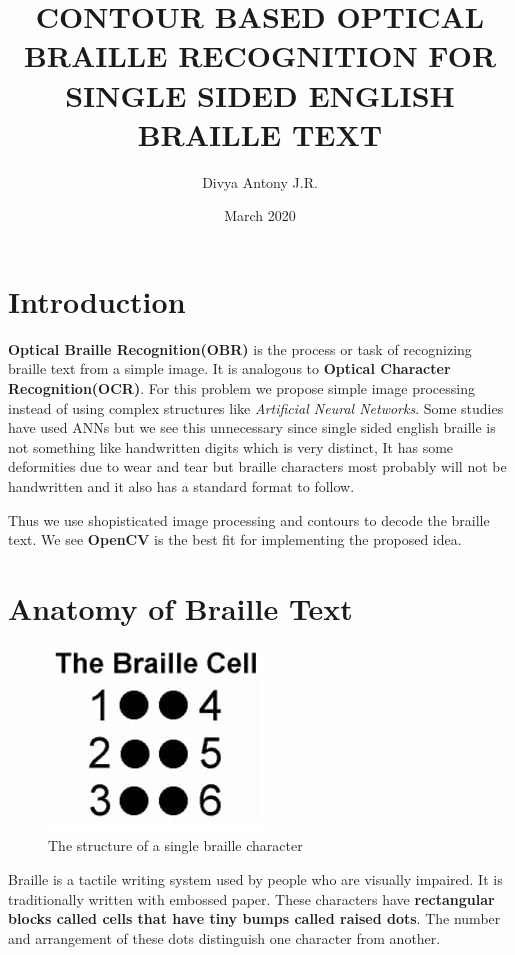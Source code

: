 \documentclass{article}
\title{CONTOUR BASED OPTICAL BRAILLE RECOGNITION FOR SINGLE SIDED ENGLISH BRAILLE TEXT}
\author{Divya Antony J.R.}
\date{March 2020}
\begin{document}
\maketitle

\section{Introduction}

\textbf{Optical Braille Recognition(OBR)} is the process or task of recognizing braille text from a simple image.
It is analogous to \textbf{Optical Character Recognition(OCR)}. For this problem we propose simple image processing 
instead of using complex structures like \emph{Artificial Neural Networks}. Some studies have used ANNs but we see
this unnecessary since single sided english braille is not something like handwritten digits which is very distinct,
It has some deformities due to wear and tear but braille characters most probably will not be handwritten 
and it also has a standard format to follow.

Thus we use shopisticated image processing and contours to decode the braille text. We see \textbf{OpenCV} is the best 
fit for implementing the proposed idea.

\section{Anatomy of Braille Text}

\begin{figure}[!htb]
\caption{The structure of a single braille character}
\centering
\includegraphics[scale=0.3]{braillecell}
\end{figure}



Braille is a tactile writing system used by people who are visually impaired. It is traditionally written with embossed paper.
These characters have \textbf{rectangular blocks called cells that have tiny bumps called raised dots}. The number and arrangement of these dots distinguish one character from another.
\end{document}
